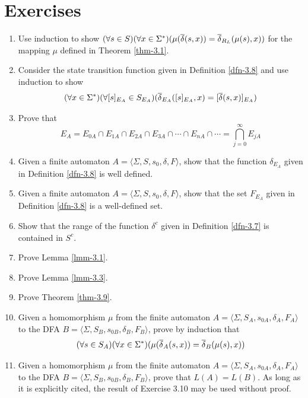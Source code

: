 \section*{Exercises}
\begin{enumerate}[{3.}1. ]
\item Use induction to show $(\forall s \in S)(\forall x \in \Sigma^*)
(\mu(\overline{\delta}(s,x))=\overline{\delta}_{R_L}(\mu(s), x))$ for the mapping $\mu$ defined in
Theorem \ref{thm-3.1}. %

\item Consider the state transition function given in Definition \ref{dfn-3.8} and use
induction to show
\[ (\forall x \in \Sigma^*)(\forall[s]_{E_A} \in S_{E_A})
	(\overline{\delta}_{E_A}([s]_{E_A},x) = [\overline{\delta}(s,x)]_{E_A}) \]

\item Prove that
\[ E_A = E_{0A} \cap E_{1A} \cap E_{2A} \cap E_{3A} \cap \cdots \cap E_{nA} \cap
	\cdots = \bigcap\limits^\infty_{j=0} E_{jA} \]

\item Given a finite automaton $A =\langle\Sigma,S,s_0,\delta,F\rangle$, show
that the function $\delta_{E_A}$ given in Definition \ref{dfn-3.8} is well defined.

\item Given a finite automaton $A =\langle\Sigma,S,s_0,\delta,F\rangle$, show
that the set $F_{E_A}$ given in Definition \ref{dfn-3.8} is a well-defined set.

\item Show that the range of the function $\delta^c$ given in Definition \ref{dfn-3.7} is
contained in $S^c$.

\item Prove Lemma \ref{lmm-3.1}.

\item Prove Lemma \ref{lmm-3.3}.

\item Prove Theorem \ref{thm-3.9}.

\item Given a homomorphism $\mu$ from the finite automaton 
$A=\langle\Sigma,S_A,s_{0A},\delta_A,F_A\rangle$ to the DFA 
$B=\langle\Sigma,S_B,s_{0B},\delta_B,F_B\rangle$, prove by induction that
\[ (\forall s \in S_A)(\forall x \in \Sigma^*)(\mu(\overline{\delta}_A(s,x)) =
	\overline{\delta}_B(\mu(s),x)) \]
	
\item Given a homomorphism $\mu$ from the finite automaton
$A=\langle\Sigma,S_A,s_{0A},\delta_A,F_A\rangle$ to the DFA 
$B=\langle\Sigma,S_B,s_{0B},\delta_B,F_B\rangle$, prove that $L(A)=L(B)$. As
long as it is explicitly cited, the result of Exercise 3.10 may be used without
proof.


\end{enumerate}
